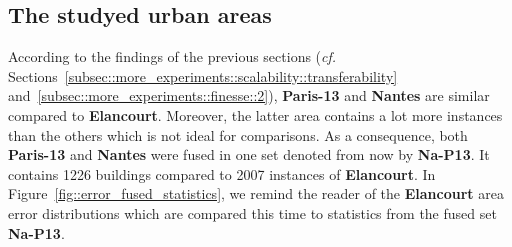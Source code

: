     \subsection{The studyed urban areas}
        \label{subsec::more_experiments::classifier::dataset}
        According to the findings of the previous sections (\textit{cf.} Sections~\ref{subsec::more_experiments::scalability::transferability} and~\ref{subsec::more_experiments::finesse::2}), \textbf{Paris-13} and \textbf{Nantes} are similar compared to \textbf{Elancourt}.
        Moreover, the latter area contains a lot more instances than the others which is not ideal for comparisons.
        As a consequence, both \textbf{Paris-13} and \textbf{Nantes} were fused in one set denoted from now by \textbf{Na-P13}.
        It contains 1226 buildings compared to 2007 instances of \textbf{Elancourt}.
        In Figure~\ref{fig::error_fused_statistics}, we remind the reader of the \textbf{Elancourt} area error distributions which are compared this time to statistics from the fused set \textbf{Na-P13}.\\
    
        \begin{figure}[htpb]
            \centering
        \end{figure}

